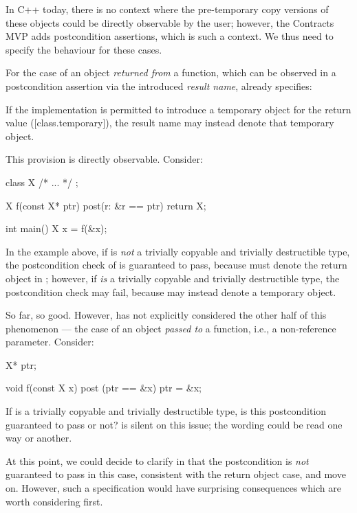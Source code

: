In C++ today, there is no context where the pre-temporary copy versions of these objects could be directly observable by the user; however, the Contracts MVP \cite{P2900R10} adds postcondition assertions, which is such a context. We thus need to specify the behaviour for these cases.

For the case of an object \emph{returned from} a function, which can be observed in a postcondition assertion via the introduced \emph{result name}, \cite{P2900R10} already specifies:

\begin{adjustwidth}{0.5cm}{0.5cm}
If the implementation is permitted to introduce a temporary object for the return value
([class.temporary]), the result name may instead denote that temporary object.
\end{adjustwidth}

This provision is directly observable. Consider:

\pagebreak %
\begin{codeblock}
class X { /* ... */ };

X f(const X* ptr) post(r: &r == ptr) {
  return X{};
}

int main() {
  X x = f(&x);
}
\end{codeblock}

In the example above, if  is \emph{not} a trivially copyable and trivially destructible type, the postcondition check of  is guaranteed to pass, because  must denote the return object  in ; however, if  \emph{is} a trivially copyable and trivially destructible type, the postcondition check may fail, because  may instead denote a temporary object.

So far, so good. However, \cite{P2900R10} has not explicitly considered the other half of this phenomenon --- the case of an object \emph{passed to} a function, i.e., a non-reference parameter. Consider:

\begin{codeblock}
X* ptr;

void f(const X x) post (ptr == &x) {
  ptr = &x;
}
\end{codeblock}
If  is a trivially copyable and trivially destructible type, is this postcondition guaranteed to pass or not? \cite{P2900R10} is silent on this issue; the wording could be read one way or another.

At this point, we could decide to clarify in \cite{P2900R10} that the postcondition is \emph{not} guaranteed to pass in this case, consistent with the return object case, and move on. However, such a specification would have surprising consequences which are worth considering first.

